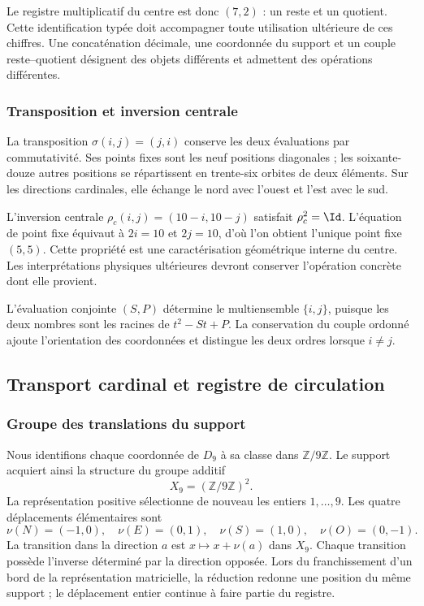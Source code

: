 Le registre multiplicatif du centre est donc $(7,2)$ : un reste et un quotient. Cette identification typée doit accompagner toute utilisation ultérieure de ces chiffres. Une concaténation décimale, une coordonnée du support et un couple reste--quotient désignent des objets différents et admettent des opérations différentes.

\subsubsection{Transposition et inversion centrale}

La transposition $\sigma(i,j)=(j,i)$ conserve les deux évaluations par commutativité. Ses points fixes sont les neuf positions diagonales ; les soixante-douze autres positions se répartissent en trente-six orbites de deux éléments. Sur les directions cardinales, elle échange le nord avec l'ouest et l'est avec le sud.

L'inversion centrale $\rho_c(i,j)=(10-i,10-j)$ satisfait $\rho_c^2=\Id$. L'équation de point fixe équivaut à $2i=10$ et $2j=10$, d'où l'on obtient l'unique point fixe $(5,5)$. Cette propriété est une caractérisation géométrique interne du centre. Les interprétations physiques ultérieures devront conserver l'opération concrète dont elle provient.

L'évaluation conjointe $(S,P)$ détermine le multiensemble $\{i,j\}$, puisque les deux nombres sont les racines de $t^2-St+P$. La conservation du couple ordonné ajoute l'orientation des coordonnées et distingue les deux ordres lorsque $i\neq j$.

\subsection{Transport cardinal et registre de circulation}
\label{sec:app-transporte}

\subsubsection{Groupe des translations du support}

Nous identifions chaque coordonnée de $D_9$ à sa classe dans $\mathbb Z/9\mathbb Z$. Le support acquiert ainsi la structure du groupe additif
\[
 X_9=(\mathbb Z/9\mathbb Z)^2.
\]
La représentation positive sélectionne de nouveau les entiers $1,\ldots,9$. Les quatre déplacements élémentaires sont
\begin{equation}
 \nu(N)=(-1,0),\quad \nu(E)=(0,1),\quad
 \nu(S)=(1,0),\quad \nu(O)=(0,-1).
\end{equation}
La transition dans la direction $a$ est $x\mapsto x+\nu(a)$ dans $X_9$. Chaque transition possède l'inverse déterminé par la direction opposée. Lors du franchissement d'un bord de la représentation matricielle, la réduction redonne une position du même support ; le déplacement entier continue à faire partie du registre.

